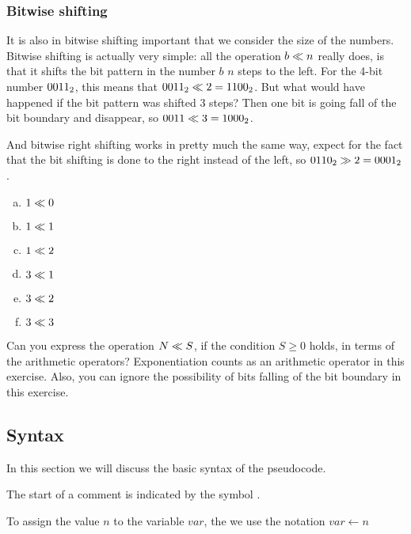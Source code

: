 \subsubsection{Bitwise shifting}

It is also in bitwise shifting important that we consider the size of
the numbers. Bitwise shifting is actually very simple: all the
operation $b \ll n$ really does, is that it shifts the bit
pattern in the number $b$ $n$ steps to the left. For the 4-bit number
$\mbox{\ensuremath{0011_2}}$, this means that $\mbox{\ensuremath{0011_2}} \ll 2 = \mbox{\ensuremath{1100_2}}$. But what would
have happened if the bit pattern was shifted 3 steps? Then one bit is
going fall of the bit boundary and disappear, so ${0011} \ll 3 =
\mbox{\ensuremath{1000_2}}$.

And bitwise right shifting works in pretty much the same way, expect
for the fact that the bit shifting is done to the right instead of the
left, so $\mbox{\ensuremath{0110_2}} \gg 2 = \mbox{\ensuremath{0001_2}}$.

\begin{Exercise}[label={bit-equiv}]

  \begin{enumerate}[(a)]
  \item $1 \ll 0$
  \item $1 \ll 1$
  \item $1 \ll 2$
  \item $3 \ll 1$
  \item $3 \ll 2$
  \item $3 \ll 3$
  \end{enumerate}

  Can you express the operation $N \ll S$, if the condition $S
  \geq 0$ holds, in terms of the arithmetic operators? Exponentiation
  counts as an arithmetic operator in this exercise. Also, you can
  ignore the possibility of bits falling of the bit boundary in this
  exercise.

\end{Exercise}


\subsection{Syntax}

In this section we will discuss the basic syntax of the pseudocode.

The start of a comment is indicated by the symbol \commentsymbol.

To assign the value $n$ to the variable $var$, the we use the
notation $var \gets n$

